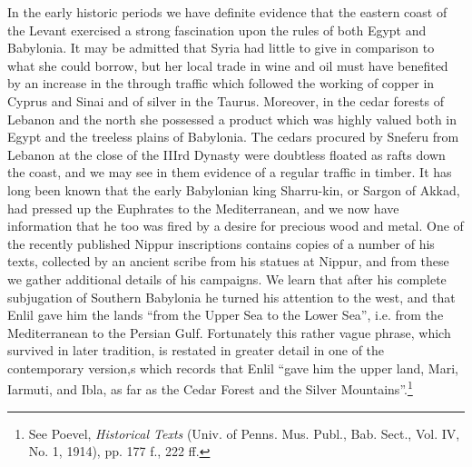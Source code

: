 \documentclass[12pt,oneside]{book}
\begin{document}
In the early historic periods we have definite evidence that the eastern coast of the Levant exercised a strong fascination upon the rules of both Egypt and Babylonia. It may be admitted that Syria had little to give in comparison to what she could borrow, but her local trade in wine and oil must have benefited by an increase in the through traffic  which followed the working of copper in Cyprus and Sinai and of silver in the Taurus. Moreover, in the cedar forests of Lebanon and the north she possessed a product which was highly valued both in Egypt and the treeless plains of Babylonia. The cedars procured by Sneferu from Lebanon at the close of the IIIrd Dynasty were doubtless floated as rafts down the coast, and we may see in them evidence of a regular traffic in timber. It has long been known that the early Babylonian king Sharru-kin, or Sargon of Akkad, had pressed up the Euphrates to the Mediterranean, and we now have information that he too was fired by a desire for precious wood and metal. One of the recently published Nippur inscriptions contains copies of a number of his texts, collected by an ancient scribe from his statues at Nippur, and from these we gather additional details of his campaigns. We learn that after his complete subjugation of Southern Babylonia he turned his attention to the west, and that Enlil gave him the lands ``from the Upper Sea to the Lower Sea'', i.e. from the Mediterranean to the Persian Gulf. Fortunately this rather vague phrase, which survived in later tradition, is restated in greater detail in one of the contemporary version,s which records that Enlil ``gave him the upper land, Mari, Iarmuti, and Ibla, as far as the Cedar Forest and the Silver Mountains''.\footnote{See Poevel, \textit{Historical Texts} (Univ. of Penns. Mus. Publ., Bab. Sect., Vol. IV, No. 1, 1914), pp. 177 f., 222 ff.} \par 
\end{document}
